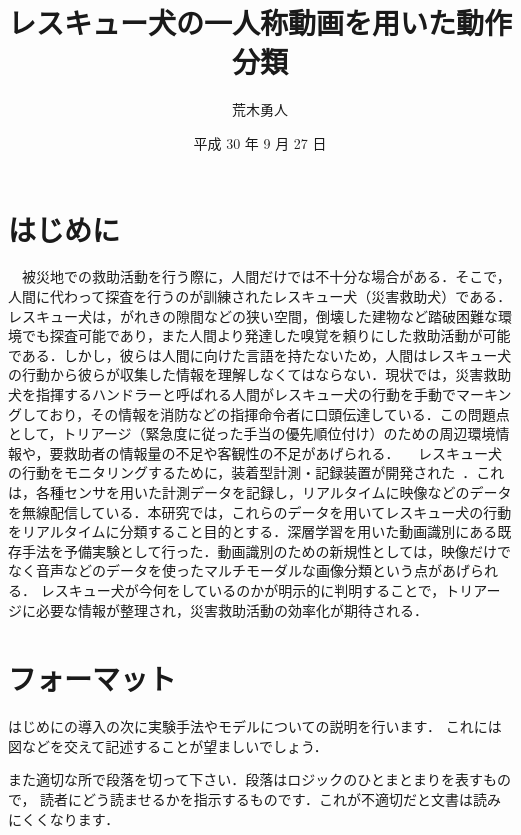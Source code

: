 \documentclass[twocolumn, a4paper]{UECIEresume}
\title{レスキュー犬の一人称動画を用いた動作分類}
\date{平成 30 年 9 月 27 日}
\affiliation{総合情報学科 メディア情報学コース}
\author{荒木勇人}
\begin{document}
\maketitle

\section{はじめに}
　被災地での救助活動を行う際に，人間だけでは不十分な場合がある．そこで，人間に代わって探査を行うのが訓練されたレスキュー犬（災害救助犬）である．レスキュー犬は，がれきの隙間などの狭い空間，倒壊した建物など踏破困難な環境でも探査可能であり，また人間より発達した嗅覚を頼りにした救助活動が可能である．しかし，彼らは人間に向けた言語を持たないため，人間はレスキュー犬の行動から彼らが収集した情報を理解しなくてはならない．現状では，災害救助犬を指揮するハンドラーと呼ばれる人間がレスキュー犬の行動を手動でマーキングしており，その情報を消防などの指揮命令者に口頭伝達している．この問題点として，トリアージ（緊急度に従った手当の優先順位付け）のための周辺環境情報や，要救助者の情報量の不足や客観性の不足があげられる．
　レスキュー犬の行動をモニタリングするために，装着型計測・記録装置が開発された~\cite{dog01}．これは，各種センサを用いた計測データを記録し，リアルタイムに映像などのデータを無線配信している．本研究では，これらのデータを用いてレスキュー犬の行動をリアルタイムに分類すること目的とする．深層学習を用いた動画識別にある既存手法を予備実験として行った．動画識別のための新規性としては，映像だけでなく音声などのデータを使ったマルチモーダルな画像分類という点があげられる．
レスキュー犬が今何をしているのかが明示的に判明することで，トリアージに必要な情報が整理され，災害救助活動の効率化が期待される．

\section{フォーマット}
はじめにの導入の次に実験手法やモデルについての説明を行います．
これには図などを交えて記述することが望ましいでしょう．

また適切な所で段落を切って下さい．段落はロジックのひとまとまりを表すもので，
読者にどう読ませるかを指示するものです．これが不適切だと文書は読みにくくなります．
\end{document}
